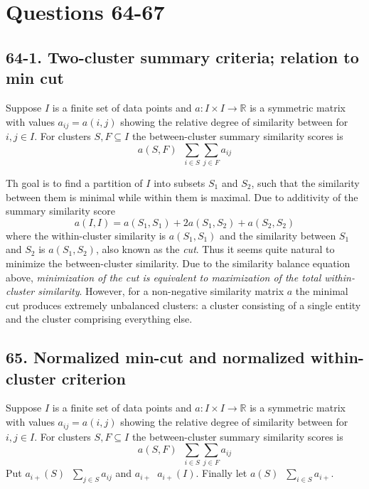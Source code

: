 \documentclass[a4paper]{article}
\newcommand{\Real}{\mathbb{R}}
\newcommand{\defn}{\mathop{\overset{\Delta}{=}}\nolimits}
\begin{document}


\section*{Questions 64-67} %
\label{sec:questions_64_67}

\subsection*{64-1. Two-cluster summary criteria; relation to min cut} %
\label{sub:queston_64_1}
Suppose $I$ is a finite set of data points and  $a:I\times I \to \Real$ is a symmetric matrix with values $a_{ij} = a(i,j)$ showing the relative degree of similarity between for $i,j\in I$. For clusters $S,F\subseteq I$ the between-cluster summary similarity scores is \[a(S,F)\defn \sum_{i\in S}\sum_{j\in F} a_{ij}\]

Th goal is to find a partition of $I$ into subsets $S_1$ and $S_2$, such that the similarity between them is minimal while within them is maximal. Due to additivity of the summary similarity score \[a(I,I) = a(S_1,S_1) + 2 a(S_1,S_2) + a(S_2,S_2)\] where the within-cluster similarity is $a(S_1,S_1)$ and the similarity between $S_1$ and $S_2$ is $a(S_1,S_2)$, also known as the \emph{cut}. Thus it seems quite natural to minimize the between-cluster similarity. Due to the similarity balance equation above, \emph{minimization of the cut is equivalent to maximization of the total within-cluster similarity}. However, for a non-negative similarity matrix $a$ the minimal cut produces extremely unbalanced clusters: a cluster consisting of a single entity and the cluster comprising everything else.


\subsection*{65. Normalized min-cut and normalized within-cluster criterion} %
\label{sub:question_65}
Suppose $I$ is a finite set of data points and $a:I\times I \to \Real$ is a symmetric matrix with values $a_{ij} = a(i,j)$ showing the relative degree of similarity between for $i,j\in I$. For clusters $S,F\subseteq I$ the between-cluster summary similarity scores is \[a(S,F)\defn \sum_{i\in S}\sum_{j\in F} a_{ij}\] Put $a_{i+}(S)\defn \sum_{j\in S} a_{ij}$ and $a_{i+} \defn a_{i+}(I)$. Finally let $a(S) \defn \sum_{i\in S} a_{i+}$.
\end{document}

